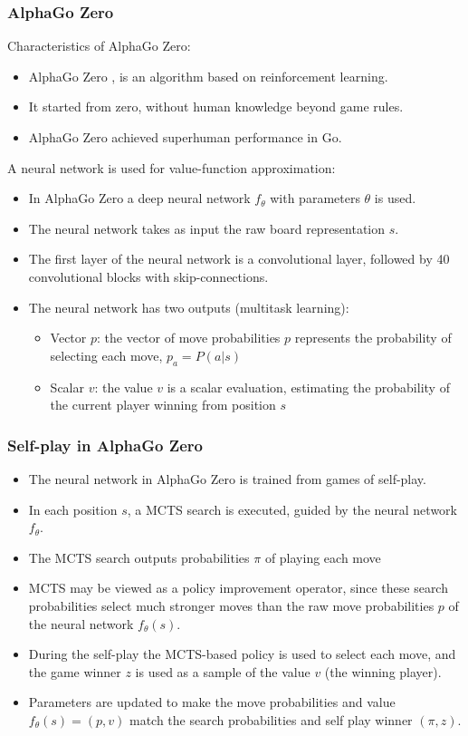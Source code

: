 \documentclass[9pt]{beamer}
\begin{document}
\begin{frame}
	\frametitle{AlphaGo Zero}
	Characteristics of AlphaGo Zero:
	\begin{itemize}
		\item AlphaGo Zero \cite{silver2017mastering}, is an algorithm based on reinforcement learning.
		\item It started from zero, without human knowledge beyond game rules.
		\item AlphaGo Zero achieved superhuman performance in Go.
	\end{itemize}

	A neural network is used for value-function approximation:
	\begin{itemize}
		\item In AlphaGo Zero a deep neural network $f_\theta$ with parameters $\theta$ is used.
		\item The neural network takes as input the raw board representation $s$.
		\item The first layer of the neural network is a convolutional layer, followed by 40 convolutional blocks with skip-connections.
		\item The neural network has two outputs (multitask learning):
		\begin{itemize}		
			\item Vector $p$: the vector of move probabilities $p$ represents the probability of selecting each move, $p_a = P(a | s)$
			\item Scalar $v$: the value $v$ is a scalar evaluation, estimating the probability of the current player winning from position $s$
		\end{itemize}
	\end{itemize}
\end{frame}



\begin{frame}
	\frametitle{Self-play in AlphaGo Zero}
	
	\begin{itemize}
		\item The neural network in AlphaGo Zero is trained from games of self-play.
		\item In each position $s$, a MCTS search is executed, guided by the neural network $f_\theta$.
		\item The MCTS search outputs probabilities $\pi$ of playing each move
		\item MCTS may be viewed as a policy improvement operator, since these search probabilities select much stronger moves than the raw move probabilities $p$ of the neural network $f_\theta(s)$.
		\item During the self-play the MCTS-based policy is used to select each move, and the game winner $z$ is used as a sample of the value $v$ (the winning player).
		\item Parameters are updated to make the move probabilities and value $f_\theta(s) = (p, v) $ match the search probabilities and self play winner $(\pi, z)$.
	\end{itemize}
\end{frame}
\end{document}
